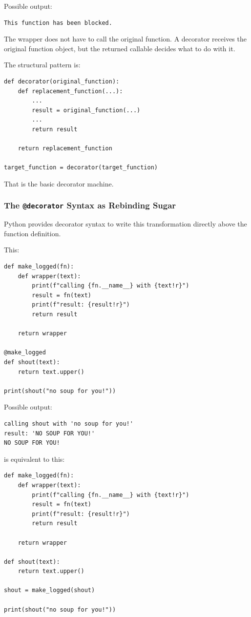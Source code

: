 Possible output:

\begin{verbatim}
This function has been blocked.
\end{verbatim}

The wrapper does not have to call the original function. A decorator receives the original function object, but the returned callable decides what to do with it.

The structural pattern is:

\begin{verbatim}
def decorator(original_function):
    def replacement_function(...):
        ...
        result = original_function(...)
        ...
        return result

    return replacement_function

target_function = decorator(target_function)
\end{verbatim}

That is the basic decorator machine.

\subsubsection{The \texttt{@decorator} Syntax as Rebinding Sugar}

Python provides decorator syntax to write this transformation directly above the function definition.

This:

\begin{verbatim}
def make_logged(fn):
    def wrapper(text):
        print(f"calling {fn.__name__} with {text!r}")
        result = fn(text)
        print(f"result: {result!r}")
        return result

    return wrapper

@make_logged
def shout(text):
    return text.upper()

print(shout("no soup for you!"))
\end{verbatim}

Possible output:

\begin{verbatim}
calling shout with 'no soup for you!'
result: 'NO SOUP FOR YOU!'
NO SOUP FOR YOU!
\end{verbatim}

is equivalent to this:

\begin{verbatim}
def make_logged(fn):
    def wrapper(text):
        print(f"calling {fn.__name__} with {text!r}")
        result = fn(text)
        print(f"result: {result!r}")
        return result

    return wrapper

def shout(text):
    return text.upper()

shout = make_logged(shout)

print(shout("no soup for you!"))
\end{verbatim}

